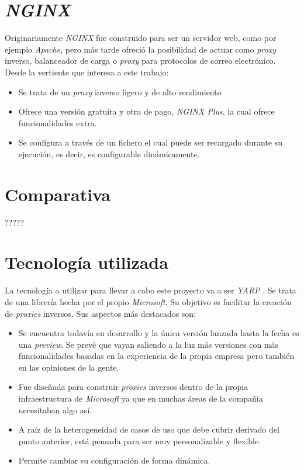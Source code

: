 \documentclass[11pt,spanish,listoffigures]{tfgetsinf}
\begin{document}
\section{\emph{NGINX}}
Originariamente \emph{NGINX} \cite{NGINX} fue construido para ser un servidor web, como por ejemplo \emph{Apache}, pero más tarde ofreció la posibilidad de actuar como \emph{proxy} inverso, balanceador de carga o \emph{proxy} para protocolos de correo electrónico. Desde la vertiente que interesa a este trabajo:

\begin{itemize}

	\item Se trata de un \emph{proxy} inverso ligero y de alto rendimiento
	\item Ofrece una versión gratuita y otra de pago, \emph{NGINX Plus}, la cual ofrece funcionalidades extra.
	\item Se configura a través de un fichero el cual puede ser recargado durante su ejecución, es decir, es configurable dinámicamente.

\end{itemize}

\section{Comparativa}

?????

\section{Tecnología utilizada}

La tecnología a utilizar para llevar a cabo este proyecto va a ser \emph{YARP} \cite{YARP}. Se trata de una librería hecha por el propio \emph{Microsoft}. Su objetivo es facilitar la creación de \emph{proxies} inversos. Sus aspectos más destacados son:

\begin{itemize}

	\item Se encuentra todavía en desarrollo y la única versión lanzada hasta la fecha es una \emph{preview}. Se prevé que vayan saliendo a la luz más versiones con más funcionalidades basadas en la experiencia de la propia empresa pero también en las opiniones de la gente.
	\item Fue diseñada para construir \emph{proxies} inversos dentro de la propia infraestructura de \emph{Microsoft} ya que en muchas áreas de la compañía necesitaban algo así.
	\item A raíz de la heterogeneidad de casos de uso que debe cubrir derivado del punto anterior, está pensada para ser muy personalizable y flexible.
	\item Permite cambiar su configuración de forma dinámica.

\end{itemize}
\end{document}
